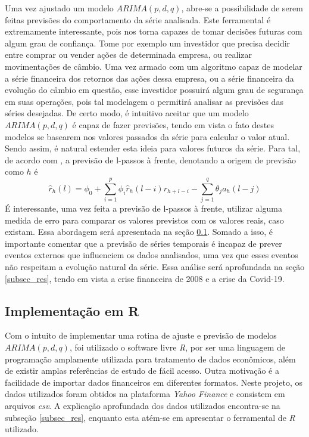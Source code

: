 \documentclass[12pt]{article}
\begin{document}
Uma vez ajustado um modelo $ARIMA(p,d,q)$, abre-se a possibilidade de serem feitas previsões do comportamento da série analisada. Este ferramental é extremamente interessante, pois nos torna capazes de tomar decisões futuras com algum grau de confiança. Tome por exemplo um investidor que precisa decidir entre comprar ou vender ações de determinada empresa, ou realizar movimentações de câmbio. Uma vez armado com um algoritmo capaz de modelar a série financeira dos retornos das ações dessa empresa, ou a série financeira da evolução do câmbio em questão, esse investidor possuirá algum grau de segurança em suas operações, pois tal modelagem o permitirá analisar as previsões das séries desejadas. De certo modo, é intuitivo aceitar que um modelo $ARIMA(p,d,q)$ é capaz de fazer previsões, tendo em vista o fato destes modelos se basearem nos valores passados da série para calcular o valor atual. Sendo assim, é natural estender esta ideia para valores futuros da série. Para tal, de acordo com \cite{Tsay}, a previsão de l-passos à frente, denotando a origem de previsão como $h$ é  
\begin{equation}\label{eq_for_arma}
\hat{r}_{h}(l)=\phi_{0}+\sum_{i=1}^{p}\phi_{i}\hat{r}_{h}(l-i)r_{h+l-i}-\sum_{j=1}^{q}\theta_{j}a_{h}(l-j)
\end{equation}
É interessante, uma vez feita a previsão de l-passos à frente, utilizar alguma medida de erro para comparar os valores previstos com os valores reais, caso existam. Essa abordagem será apresentada na seção \ref{subsec_R}. Somado a isso, é importante comentar que a previsão de séries temporais é incapaz de prever eventos externos que influenciem os dados analisados, uma vez que esses eventos não respeitam a evolução natural da série. Essa análise será aprofundada na seção \ref{subsec_res}, tendo em vista a crise financeira de 2008 e a crise da Covid-19.

\subsection{Implementação em R}\label{subsec_R}
Com o intuito de implementar uma rotina de ajuste e previsão de modelos $ARIMA(p,d,q)$, foi utilizado o software livre \emph{R}, por ser uma linguagem de programação amplamente utilizada para tratamento de dados econômicos, além de existir amplas referências de estudo de fácil acesso. Outra motivação é a facilidade de importar dados financeiros em diferentes formatos. Neste projeto, os dados utilizados foram obtidos na plataforma \textit{Yahoo Finance} e consistem em arquivos \textit{csv}. A explicação aprofundada dos dados utilizados encontra-se na subseção \ref{subsec_res}, enquanto esta atém-se em apresentar o ferramental de \emph{R} utilizado.
\end{document}
